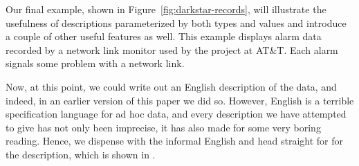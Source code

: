 Our final example, shown in
Figure~\ref{fig:darkstar-records}, will illustrate 
the usefulness of descriptions parameterized by
both types and values and introduce a couple of other
useful features as well.   This example displays
alarm data recorded by a network link monitor
used by the \darkstar{} project at AT\&T.  Each alarm signals some
problem with a network link.  

Now, at this point, we could write out an English description
of the \darkstar{} data, and indeed, in an earlier version of this paper
we did so.  However, English is a terrible specification language
for ad hoc data, and every description we have attempted to give has not 
only been imprecise, it has also made for some very 
boring reading.  Hence, we dispense with the informal
English and head straight for for the \datatype{} description,
which is shown in .



